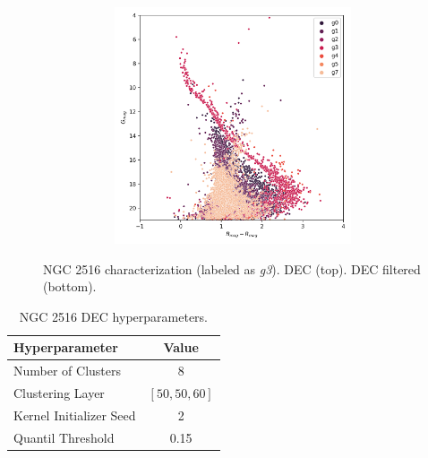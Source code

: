 \documentclass[11pt,a4paper,english,twocolumn]{article}
\begin{document}
\begin{figure}[htbp]
\begin{subfigure}{\columnwidth}
\begin{subfigure}[t]{0.30\textwidth}
    \end{subfigure}
    \hfill
    \begin{subfigure}[t]{0.30\textwidth}
      \centering
      \includegraphics[width=\textwidth]{../figures/ngc_2516/dec_hr_diagram_filtered_ngc_2516.png}
    \end{subfigure}
  \end{subfigure}
  \caption{NGC 2516 characterization (labeled as \emph{g3}).
           DEC (top). DEC filtered (bottom).}
  \label{fig:app_result_ngc_2516_dec}
\end{figure}

\begin{table}[htbp]
  \begin{center}
    \begin{tabular}{l|c}
      \textbf{Hyperparameter} & \textbf{Value} \\
      \hline
      Number of Clusters & 8 \\
      Clustering Layer & \(\left[ 50, 50, 60 \right]\) \\
      Kernel Initializer Seed & 2 \\
      Quantil Threshold & 0.15 \\
    \end{tabular}
    \caption{NGC 2516 DEC hyperparameters.}
    \label{tab:app_hyperparameters_ngc_2516}
  \end{center}
\end{table}
\end{document}
